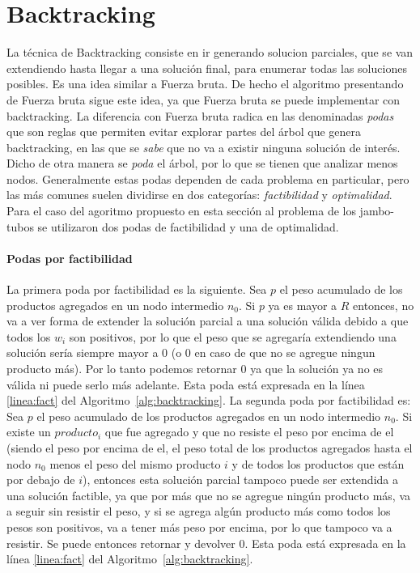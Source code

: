 \documentclass[10pt,a4paper]{article}
\begin{document}
\section{Backtracking} \label{sec:backtracking}
La técnica de Backtracking consiste en ir generando solucion parciales, que se van extendiendo hasta llegar a una solución final, para enumerar todas las soluciones posibles. Es una idea similar a Fuerza bruta. De hecho el algoritmo presentando de Fuerza bruta sigue este idea, ya que Fuerza bruta se puede implementar con backtracking. La diferencia con Fuerza bruta radica en las denominadas \emph{podas} que son reglas que permiten evitar explorar partes del árbol que genera backtracking, en las que se \emph{sabe} que no va a existir ninguna solución de interés. Dicho de otra manera se \emph{poda} el árbol, por lo que se tienen que analizar menos nodos.  Generalmente estas podas dependen de cada problema en particular, pero las más comunes suelen dividirse en dos categorías: \emph{factibilidad} y \emph{optimalidad}. Para el caso del agoritmo propuesto en esta sección al problema de los jambo-tubos se utilizaron dos podas de factibilidad y una de optimalidad. 

\paragraph{Podas por factibilidad}
La primera poda por factibilidad es la siguiente. Sea $p$ el peso acumulado de los productos agregados en un nodo intermedio $n_0$. Si $p$ ya es mayor a $R$ entonces, no va a ver forma de extender la solución parcial a una solución válida debido a que todos los $w_i$ son positivos, por lo que el peso que se agregaría extendiendo una solución sería siempre mayor a 0 (o 0 en caso de que no se agregue ningun producto más). Por lo tanto podemos retornar 0 ya que la solución ya no es válida ni puede serlo más adelante. Esta poda está expresada en la línea \ref{linea:fact} del Algoritmo~\ref{alg:backtracking}.
La segunda poda por factibilidad es: Sea $p$ el peso acumulado de los productos agregados en un nodo intermedio $n_0$. Si existe un $producto_i$ que fue agregado y que no resiste el peso por encima de el (siendo el peso por encima de el, el peso total de los productos agregados hasta el nodo $n_0$ menos el peso del mismo producto $i$ y de todos los productos que están por debajo de $i$), entonces esta solución parcial tampoco puede ser extendida a una solución factible, ya que por más que no se agregue ningún producto más, va a seguir sin resistir el peso, y si se agrega algún producto más como todos los pesos son positivos, va a tener más peso por encima, por lo que tampoco va a resistir. Se puede entonces retornar y devolver 0. Esta poda está expresada en la línea \ref{linea:fact} del Algoritmo~\ref{alg:backtracking}.
\end{document}
